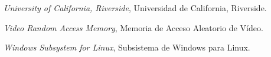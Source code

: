 \begin{description}[labelwidth=3cm,leftmargin=3.5cm,style=nextline]
\item[\textbf{UCR}] \textit{University of California, Riverside}, Universidad de California, Riverside.

\item[\textbf{VRAM}] \textit{Video Random Access Memory}, Memoria de Acceso Aleatorio de Vídeo.

\item[\textbf{WSL}] \textit{Windows Subsystem for Linux}, Subsistema de Windows para Linux.

\end{description}
